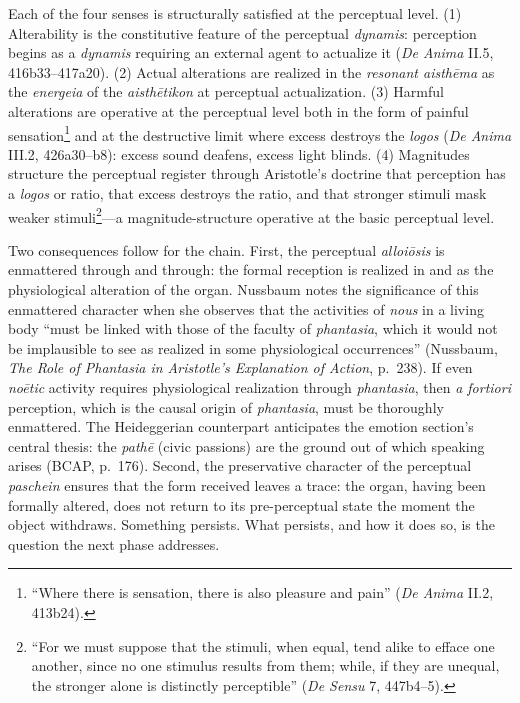 \documentclass{article}
\begin{document}
Each of the four senses is structurally satisfied at the perceptual level. (1) Alterability is the constitutive feature of the perceptual \textit{dynamis}: perception begins as a \textit{dynamis} requiring an external agent to actualize it (\textit{De Anima} II.5, 416b33--417a20). (2) Actual alterations are realized in the \textit{resonant aisthēma} as the \textit{energeia} of the \textit{aisthētikon} at perceptual actualization. (3) Harmful alterations are operative at the perceptual level both in the form of painful sensation\footnote{``Where there is sensation, there is also pleasure and pain'' (\textit{De Anima} II.2, 413b24).} and at the destructive limit where excess destroys the \textit{logos} (\textit{De Anima} III.2, 426a30--b8): excess sound deafens, excess light blinds. (4) Magnitudes structure the perceptual register through Aristotle's doctrine that perception has a \textit{logos} or ratio, that excess destroys the ratio, and that stronger stimuli mask weaker stimuli\footnote{``For we must suppose that the stimuli, when equal, tend alike to efface one another, since no one stimulus results from them; while, if they are unequal, the stronger alone is distinctly perceptible'' (\textit{De Sensu} 7, 447b4--5).}---a magnitude-structure operative at the basic perceptual level.

Two consequences follow for the chain. First, the perceptual \textit{alloiōsis} is enmattered through and through: the formal reception is realized in and as the physiological alteration of the organ. Nussbaum notes the significance of this enmattered character when she observes that the activities of \textit{nous} in a living body ``must be linked with those of the faculty of \textit{phantasia}, which it would not be implausible to see as realized in some physiological occurrences'' (Nussbaum, \textit{The Role of Phantasia in Aristotle's Explanation of Action}, p.~238). If even \textit{noētic} activity requires physiological realization through \textit{phantasia}, then \textit{a fortiori} perception, which is the causal origin of \textit{phantasia}, must be thoroughly enmattered. The Heideggerian counterpart anticipates the emotion section's central thesis: the \textit{pathē} (civic passions) are the ground out of which speaking arises (BCAP, p.~176). Second, the preservative character of the perceptual \textit{paschein} ensures that the form received leaves a trace: the organ, having been formally altered, does not return to its pre-perceptual state the moment the object withdraws. Something persists. What persists, and how it does so, is the question the next phase addresses.
\end{document}
